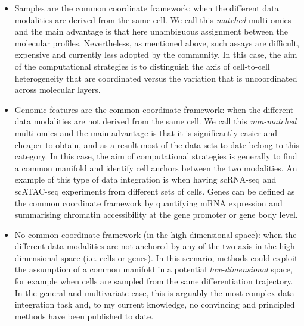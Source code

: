 \begin{itemize}

	\item Samples are the common coordinate framework: when the different data modalities are derived from the same cell. We call this \textit{matched} multi-omics and the main advantage is that here unambiguous assignment between the molecular profiles. Nevertheless, as mentioned above, such assays are difficult, expensive and currently less adopted by the community. In this case, the aim of the computational strategies is to distinguish the axis of cell-to-cell heterogeneity that are coordinated versus the variation that is uncoordinated across molecular layers.

	\item Genomic features are the common coordinate framework: when the different data modalities are not derived from the same cell. We call this \textit{non-matched} multi-omics and the main advantage is that it is significantly easier and cheaper to obtain, and as a result most of the data sets to date belong to this category. In this case, the aim of computational strategies is generally to find a common manifold and identify cell anchors between the two modalities. An example of this type of data integration is when having scRNA-seq and scATAC-seq experiments from different sets of cells. Genes can be defined as the common coordinate framework by quantifying mRNA expression and summarising chromatin accessibility at the gene promoter or gene body level.

	\item No common coordinate framework (in the high-dimensional space): when the different data modalities are not anchored by any of the two axis in the high-dimensional space (i.e. cells or genes). In this scenario, methods could exploit the assumption of a common manifold in a potential \textit{low-dimensional} space, for example when cells are sampled from the same differentiation trajectory. In the general and multivariate case, this is arguably the most complex data integration task and, to my current knowledge, no convincing and principled methods have been published to date.

\end{itemize}

